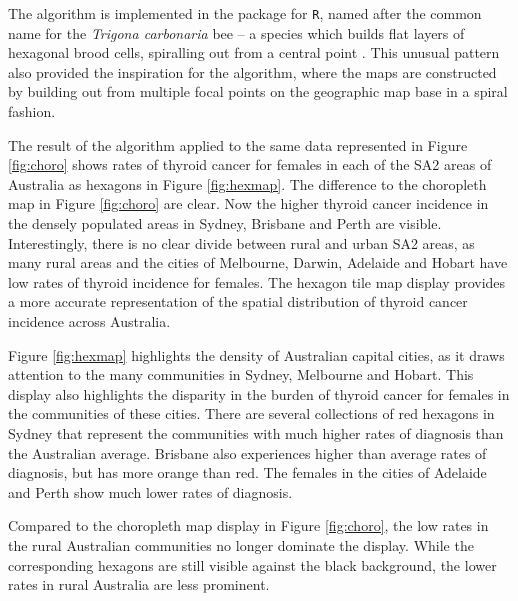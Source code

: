 The algorithm is implemented in the  package for
\texttt{R}, named after the common name for the \emph{Trigona
carbonaria} bee -- a species which builds flat layers of hexagonal brood
cells, spiralling out from a central point \citep{PH}. This unusual
pattern also provided the inspiration for the algorithm, where the maps
are constructed by building out from multiple focal points on the
geographic map base in a spiral fashion.

The result of the algorithm applied to the same data represented in
Figure \ref{fig:choro} shows rates of thyroid cancer for females in each
of the SA2 areas of Australia as hexagons in Figure \ref{fig:hexmap}.
The difference to the choropleth map in Figure \ref{fig:choro} are
clear. Now the higher thyroid cancer incidence in the densely populated
areas in Sydney, Brisbane and Perth are visible. Interestingly, there is
no clear divide between rural and urban SA2 areas, as many rural areas
and the cities of Melbourne, Darwin, Adelaide and Hobart have low rates
of thyroid incidence for females. The hexagon tile map display provides
a more accurate representation of the spatial distribution of thyroid
cancer incidence across Australia.

Figure \ref{fig:hexmap} highlights the density of Australian capital
cities, as it draws attention to the many communities in Sydney,
Melbourne and Hobart. This display also highlights the disparity in the
burden of thyroid cancer for females in the communities of these cities.
There are several collections of red hexagons in Sydney that represent
the communities with much higher rates of diagnosis than the Australian
average. Brisbane also experiences higher than average rates of
diagnosis, but has more orange than red. The females in the cities of
Adelaide and Perth show much lower rates of diagnosis.

Compared to the choropleth map display in Figure \ref{fig:choro}, the
low rates in the rural Australian communities no longer dominate the
display. While the corresponding hexagons are still visible against the
black background, the lower rates in rural Australia are less prominent.

